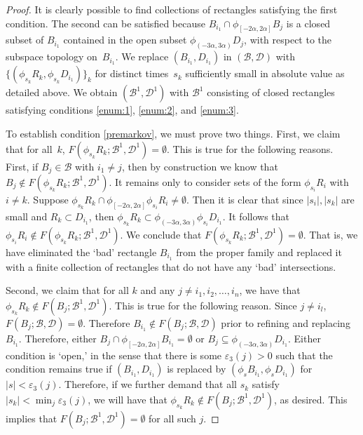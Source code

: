 \documentclass[JEP,XML,SOM,Unicode,NoFloatCountersInSection]{cedram}
\let\mathcal\mathscr
\let\epsilon\varepsilon
\theoremstyle{definition}
\numberwithin{equation}{section}
\newcommand\BBB{\mathcal B}
\begin{document}
\begin{proof}
It is clearly possible to find collections of rectangles satisfying the first condition. The second can be satisfied because $B_{i_1} \cap \phi_{[-2\alpha, 2\alpha]}B_j$ is a closed subset of $B_{i_1}$ contained in the open subset $\phi_{(-3\alpha,3\alpha)} D_j$, with respect to the subspace topology on~$B_{i_1}$.
We replace $(B_{i_1}, D_{i_1})$ in $(\mathcal{B}, \mathcal{D})$ with $\{(\phi_{s_{k}}R_{k}, \phi_{s_{k}} D_{i_1})\}_k$ for distinct times~$s_{k}$ sufficiently small in absolute value as detailed above. We obtain $(\mathcal{B}^1, \mathcal{D}^1)$ with $\mathcal{B}^1$ consisting of closed rectangles satisfying conditions \eqref{enum:1}, \eqref{enum:2}, and \eqref{enum:3}.

To establish condition \eqref{premarkov}, we must prove two things. First, we claim that for all~$k$, $F(\phi_{s_{k}}R_{k}; \mathcal{B}^1, \mathcal{D}^1) = \emptyset$. This is true for the following reasons. First, if $B_j \in \BBB$ with $i_1 \neq j$, then by construction we know that $B_j \notin F(\phi_{s_{k}}R_{k}; \mathcal{B}^1,\mathcal{D}^1)$. It remains only to consider sets of the form $\phi_{s_{i}}R_{i}$ with $i \neq k$. Suppose $\phi_{s_{k}}R_{k} \cap \phi_{[-2\alpha, 2 \alpha]} \phi_{s_{i}}R_{i} \neq \emptyset$. Then it is clear that since $|s_i|, |s_k|$ are small and $R_k \subset D_{i_1}$, then $\phi_{s_{k}}R_{k} \subset \phi_{(-3 \alpha, 3 \alpha)} \phi_{s_i} D_{i_1}$. It follows that $\phi_{s_{i}}R_{i} \notin F(\phi_{s_{k}}R_{k}; \mathcal{B}^1,\mathcal{D}^1)$. We conclude that $F(\phi_{s_{k}}R_{k}; \mathcal{B}^1, \mathcal{D}^1) = \emptyset$.
That is, we have eliminated the `bad' rectangle $B_{i_1}$ from the proper family and replaced it with a finite collection of rectangles that do not have any `bad' intersections.

Second, we claim that for all $k$ and any $j \neq i_1, i_2, \ldots, i_n$, we have that $\phi_{s_k}R_k \notin F(B_j; \mathcal{B}^1,\mathcal{D}^1)$. This is true for the following reason. Since $j \neq i_l$, $F(B_j;\mathcal{B},\mathcal{D}) = \emptyset$. Therefore $B_{i_1}\notin F(B_j; \mathcal{B},\mathcal{D})$ prior to refining and replacing $B_{i_1}$. Therefore, either $B_j \cap \phi_{[-2\alpha,2\alpha]}B_{i_1} = \emptyset$ or $B_j\subseteq \phi_{(-3\alpha,3\alpha)}D_{i_1}$. Either condition is `open,' in the sense that there is some $\epsilon_3(j)>0$ such that the condition remains true if $(B_{i_1},D_{i_1})$ is replaced by $(\phi_s B_{i_1}, \phi_s D_{i_1})$ for $|s|<\epsilon_3(j)$. Therefore, if we further demand that all $s_k$ satisfy $|s_k|<\min_j \epsilon_3(j)$, we will have that $\phi_{s_k}R_k \notin F(B_j; \mathcal{B}^1,\mathcal{D}^1)$, as desired. This implies that $F(B_j;\mathcal{B}^1,\mathcal{D}^1)=\emptyset$ for all such $j$.


\end{proof}
\end{document}
